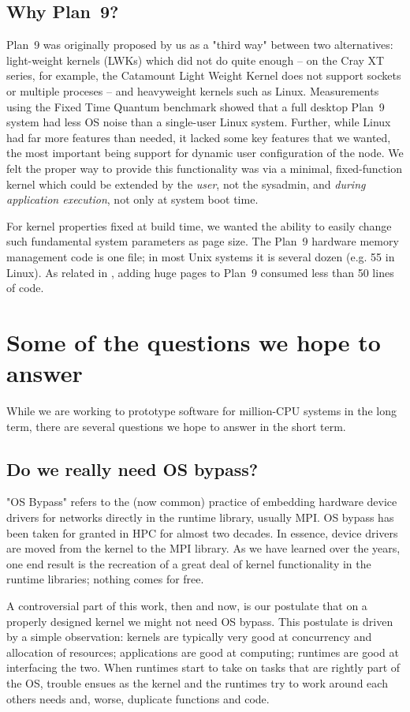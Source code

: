 \documentclass[letterpaper,twocolumn,10pt]{article}
\begin{document}
\subsection{Why Plan~9?}
Plan~9 was originally proposed by us as a "third way" between two alternatives: light-weight kernels (LWKs) which did not do quite enough -- on the Cray XT series, for example, the Catamount Light Weight Kernel does not support sockets or multiple proceses -- and heavyweight kernels such as Linux. Measurements using the Fixed Time Quantum\cite{ftq} benchmark showed that a full desktop Plan~9 system had less OS noise than a single-user Linux system. Further, while Linux had far more features than needed, it lacked some key features that we wanted, the most important being support for dynamic user configuration of the node. We felt the proper way to provide this functionality was via a minimal, fixed-function kernel which could be extended by the \textit{user}, not the sysadmin, and \textit{during application execution}, not only at system boot time. 

For kernel properties fixed at build time, we wanted the ability to easily change such fundamental system parameters as page size. The Plan~9 hardware memory management code is one file; in most Unix systems it is several dozen (e.g. 55 in Linux). As related in \cite{plan9bgp}, adding huge pages to Plan~9 consumed less than 50 lines of code. 

\section{Some of the questions we hope to answer}
While we are working to prototype software for million-CPU systems in the long term, there are several questions we hope to answer in the short term. 
\subsection{Do we really need OS bypass?}
"OS Bypass" refers to the (now common) practice of embedding hardware device drivers for networks directly in the runtime library, usually MPI. OS bypass has been taken for granted in HPC for almost two decades. In essence, device drivers are moved from the kernel to the MPI library. As we have learned over the years, one end result is the recreation of a great deal of kernel functionality in the runtime libraries; nothing comes for free. 

A controversial part of this work, then and now, is our postulate that on a properly designed kernel we might not need OS bypass. This postulate is driven by a simple observation: kernels are typically very good at concurrency and allocation of resources; applications are good at computing; runtimes are good at interfacing the two. When runtimes start to take on tasks that are rightly part of the OS, trouble ensues as the kernel and the runtimes try to work around each others needs and, worse, duplicate functions and code. 
\end{document}
